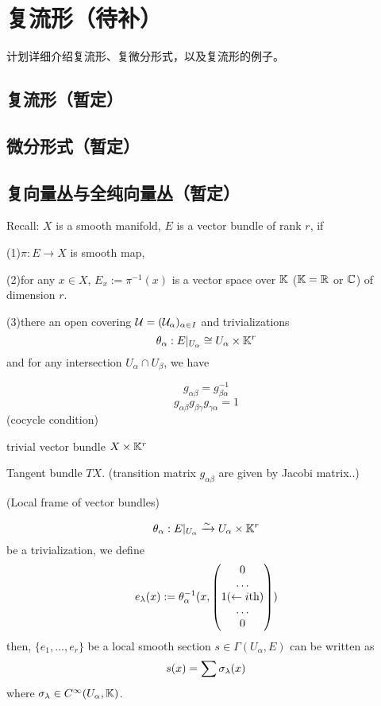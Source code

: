\chapter{复流形（待补）}
计划详细介绍复流形、复微分形式，以及复流形的例子。

\section{复流形（暂定）}

\section{微分形式（暂定）}
\section{复向量丛与全纯向量丛（暂定）}
Recall: $X$ is a smooth manifold, $E$ is a vector bundle of rank $r$, if

(1)$\pi:E\to X$ is smooth map,

(2)for any $x\in X$, $E_x:=\pi^{-1}(x)$ is a vector space over $\mathbb{K}$
($\mathbb{K}=\mathbb{R}$ or $\mathbb{C}$) of dimension $r$.

(3)there an open covering $\mathcal{U}=(\mathcal{U}_{\alpha})_{\alpha\in I}$ and trivializations
$$\theta_\alpha: E|_{U_{\alpha}}\cong U_{\alpha}\times \mathbb{K}^r$$
and for any intersection $U_{\alpha}\cap U_{\beta}$, we have

\begin{rem}
$$g_{\alpha\beta}=g_{\beta\alpha}^{-1}$$
$$g_{\alpha\beta}g_{\beta\gamma}g_{\gamma\alpha}=1$$
(cocycle condition)
\end{rem}

\begin{example}trivial vector bundle $X\times\mathbb{K}^r$
\end{example}

\begin{example}Tangent bundle $TX$.
(transition matrix $g_{\alpha\beta}$ are given by Jacobi matrix..)
\end{example}

\begin{definition}(Local frame of vector bundles)

$$\theta_{\alpha}:E|_{U_{\alpha}}\xrightarrow{\sim} U_{\alpha}\times\mathbb{K}^r$$
be a trivialization, we define
$$
  e_{\lambda}(x):=
  \theta_{\alpha}^{-1}
  (x,\begin{pmatrix}
       0\\
       \ldots\\
       1(\leftarrow i\text{th})\\
       \ldots\\
       0
     \end{pmatrix})
$$
then, $\{e_1,...,e_r\}$ be a local smooth section
$s\in\Gamma(U_{\alpha},E)$ can be written as
$$s(x)=\sum\sigma_{\lambda}(x)$$
where $\sigma_{\lambda}\in C^{\infty}(U_\alpha,\mathbb{K})$.
\end{definition}

